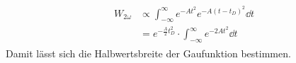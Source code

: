 \begin{align}
\begin{split}
  W_{2\omega} & \propto \int_{-\infty}^{\infty} e^{-At^2} e^{-A(t-t_D)^2} \dd{t} \\
& = e^{-\frac{A}{2} t_D^2} \cdot \int_{-\infty}^{\infty} e^{-2At^2} \dd{t}
\label{eq:Autokorr}
\end{split}
\end{align}
Damit lässt sich die Halbwertsbreite der Gaufunktion bestimmen.


